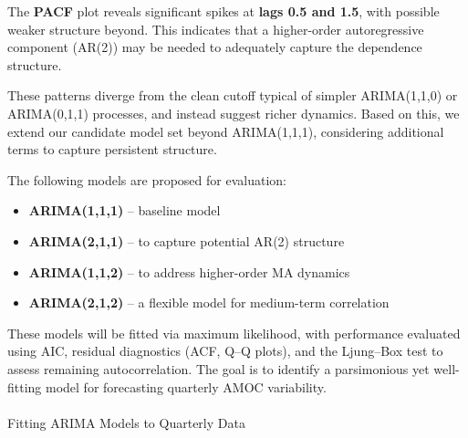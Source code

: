 \documentclass[
  11pt,
]{article}
\makeatletter
\let\oldparagraph\paragraph
\renewcommand{\paragraph}{
    \@ifstar
      \xxxParagraphStar
      \xxxParagraphNoStar
  }
\newcommand{\xxxParagraphStar}[1]{\oldparagraph*{#1}\mbox{}}
\newcommand{\xxxParagraphNoStar}[1]{\oldparagraph{#1}\mbox{}}
\makeatother
\begin{document}
The \textbf{PACF} plot reveals significant spikes at \textbf{lags 0.5
and 1.5}, with possible weaker structure beyond. This indicates that a
higher-order autoregressive component (AR(2)) may be needed to
adequately capture the dependence structure.

These patterns diverge from the clean cutoff typical of simpler
ARIMA(1,1,0) or ARIMA(0,1,1) processes, and instead suggest richer
dynamics. Based on this, we extend our candidate model set beyond
ARIMA(1,1,1), considering additional terms to capture persistent
structure.

The following models are proposed for evaluation:

\begin{itemize}
\item
  \textbf{ARIMA(1,1,1)} -- baseline model
\item
  \textbf{ARIMA(2,1,1)} -- to capture potential AR(2) structure
\item
  \textbf{ARIMA(1,1,2)} -- to address higher-order MA dynamics
\item
  \textbf{ARIMA(2,1,2)} -- a flexible model for medium-term correlation
\end{itemize}

These models will be fitted via maximum likelihood, with performance
evaluated using AIC, residual diagnostics (ACF, Q--Q plots), and the
Ljung--Box test to assess remaining autocorrelation. The goal is to
identify a parsimonious yet well-fitting model for forecasting quarterly
AMOC variability.

\paragraph{Fitting ARIMA Models to Quarterly
Data}\label{fitting-arima-models-to-quarterly-data}
\end{document}
